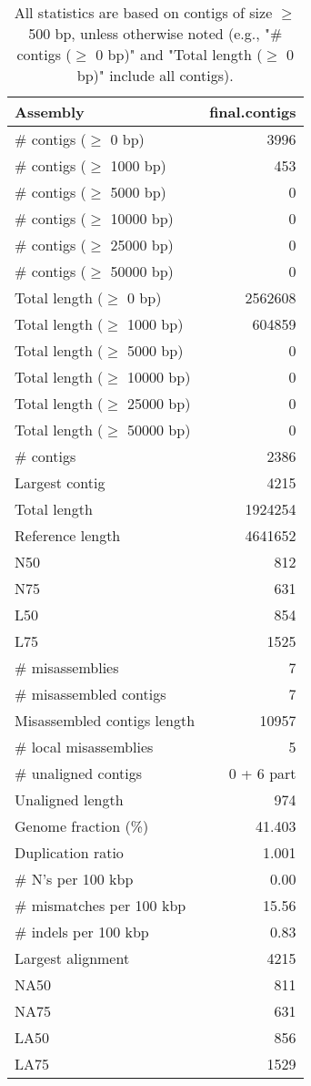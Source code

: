\documentclass[12pt,a4paper]{article}
\begin{document}
\begin{table}[ht]
\begin{center}
\caption{All statistics are based on contigs of size $\geq$ 500 bp, unless otherwise noted (e.g., "\# contigs ($\geq$ 0 bp)" and "Total length ($\geq$ 0 bp)" include all contigs).}
\begin{tabular}{|l*{1}{|r}|}
\hline
Assembly & final.contigs \\ \hline
\# contigs ($\geq$ 0 bp) & 3996 \\ \hline
\# contigs ($\geq$ 1000 bp) & 453 \\ \hline
\# contigs ($\geq$ 5000 bp) & 0 \\ \hline
\# contigs ($\geq$ 10000 bp) & 0 \\ \hline
\# contigs ($\geq$ 25000 bp) & 0 \\ \hline
\# contigs ($\geq$ 50000 bp) & 0 \\ \hline
Total length ($\geq$ 0 bp) & 2562608 \\ \hline
Total length ($\geq$ 1000 bp) & 604859 \\ \hline
Total length ($\geq$ 5000 bp) & 0 \\ \hline
Total length ($\geq$ 10000 bp) & 0 \\ \hline
Total length ($\geq$ 25000 bp) & 0 \\ \hline
Total length ($\geq$ 50000 bp) & 0 \\ \hline
\# contigs & 2386 \\ \hline
Largest contig & 4215 \\ \hline
Total length & 1924254 \\ \hline
Reference length & 4641652 \\ \hline
N50 & 812 \\ \hline
N75 & 631 \\ \hline
L50 & 854 \\ \hline
L75 & 1525 \\ \hline
\# misassemblies & 7 \\ \hline
\# misassembled contigs & 7 \\ \hline
Misassembled contigs length & 10957 \\ \hline
\# local misassemblies & 5 \\ \hline
\# unaligned contigs & 0 + 6 part \\ \hline
Unaligned length & 974 \\ \hline
Genome fraction (\%) & 41.403 \\ \hline
Duplication ratio & 1.001 \\ \hline
\# N's per 100 kbp & 0.00 \\ \hline
\# mismatches per 100 kbp & 15.56 \\ \hline
\# indels per 100 kbp & 0.83 \\ \hline
Largest alignment & 4215 \\ \hline
NA50 & 811 \\ \hline
NA75 & 631 \\ \hline
LA50 & 856 \\ \hline
LA75 & 1529 \\ \hline
\end{tabular}
\end{center}
\end{table}
\end{document}
